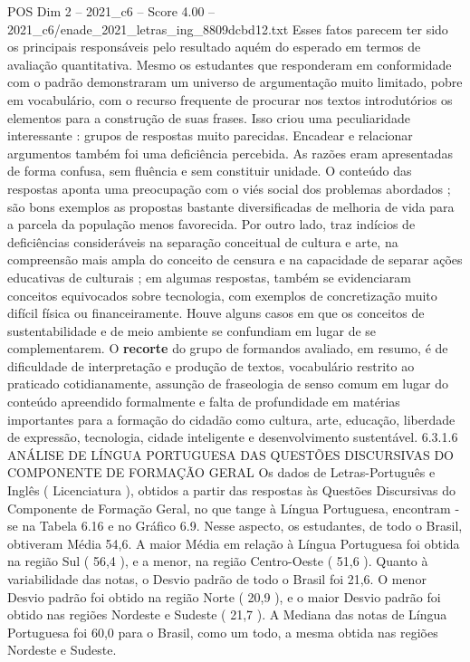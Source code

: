 \begin{textsample}{POS Dim 2 – 2021\_c6 – Score 4.00 – 2021\_c6/enade\_2021\_letras\_ing\_8809dcbd12.txt}
Esses fatos parecem ter sido os principais responsáveis pelo resultado aquém do esperado em termos de avaliação quantitativa.
Mesmo os estudantes que responderam em conformidade com o padrão demonstraram um universo de argumentação muito limitado, pobre em vocabulário, com o recurso frequente de procurar nos textos introdutórios os elementos para a construção de suas frases.
Isso criou uma peculiaridade interessante : grupos de respostas muito parecidas.
Encadear e relacionar argumentos também foi uma deficiência percebida.
As razões eram apresentadas de forma confusa, sem fluência e sem constituir unidade.
O conteúdo das respostas aponta uma preocupação com o viés social dos problemas abordados ; são bons exemplos as propostas bastante diversificadas de melhoria de vida para a parcela da população menos favorecida.
Por outro lado, traz indícios de deficiências consideráveis na separação conceitual de cultura e arte, na compreensão mais ampla do conceito de censura e na capacidade de separar ações educativas de culturais ; em algumas respostas, também se evidenciaram conceitos equivocados sobre tecnologia, com exemplos de concretização muito difícil física ou financeiramente.
Houve alguns casos em que os conceitos de sustentabilidade e de meio ambiente se confundiam em lugar de se complementarem.
O \textbf{recorte} do grupo de formandos avaliado, em resumo, é de dificuldade de interpretação e produção de textos, vocabulário restrito ao praticado cotidianamente, assunção de fraseologia de senso comum em lugar do conteúdo apreendido formalmente e falta de profundidade em matérias importantes para a formação do cidadão como cultura, arte, educação, liberdade de expressão, tecnologia, cidade inteligente e desenvolvimento sustentável. 6.3.1.6 ANÁLISE DE LÍNGUA PORTUGUESA DAS QUESTÕES DISCURSIVAS DO COMPONENTE DE FORMAÇÃO GERAL Os dados de Letras-Português e Inglês ( Licenciatura ), obtidos a partir das respostas às Questões Discursivas do Componente de Formação Geral, no que tange à Língua Portuguesa, encontram -se na Tabela 6.16 e no Gráfico 6.9.
Nesse aspecto, os estudantes, de todo o Brasil, obtiveram Média 54,6.
A maior Média em relação à Língua Portuguesa foi obtida na região Sul ( 56,4 ), e a menor, na região Centro-Oeste ( 51,6 ).
Quanto à variabilidade das notas, o Desvio padrão de todo o Brasil foi 21,6.
O menor Desvio padrão foi obtido na região Norte ( 20,9 ), e o maior Desvio padrão foi obtido nas regiões Nordeste e Sudeste ( 21,7 ).
A Mediana das notas de Língua Portuguesa foi 60,0 para o Brasil, como um todo, a mesma obtida nas regiões Nordeste e Sudeste.

\end{textsample}
